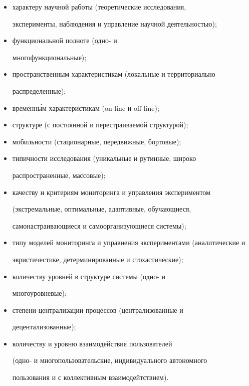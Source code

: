 \begin{itemize}


\item характеру научной работы (теоретические исследования,


               эксперименты, наблюдения и управление научной деятельностью);


\item


функциональной полноте (одно- и


многофункциональные);


\item 


пространственным характеристикам (локальные и территориально


распределенные);


\item временн\'{ы}м характеристикам (on-line и off-line);


\item


 структуре (с постоянной и перестраиваемой структурой);


\item


мобильности (стационарные, передвижные, бортовые);


\item


 типичности исследования (уникальные и рутинные, широко


распространенные, массовые);


\item


 качеству и критериям мониторинга и управления экспериментом


(экстремальные, оптимальные, адаптивные, обучающиеся,


самонастраивающиеся и самоорганизующиеся системы);


\item


типу моделей мониторинга и управнения экспериментами (аналитические и


эвристичестике, детерминированные и стохастические);


\item


 количеству уровней в структуре системы (одно- и


многоуровневые);


\item


 степени централизации процессов (централизованные и


децентализованные);


\item


 количеству и уровню взаимодействия пользователей


(одно- и многопользовательские, индивидуального автономного


пользования и с коллективным взаимодейтствием).


\end{itemize}





